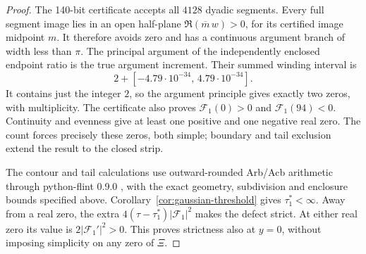 \documentclass[11pt]{article}
\theoremstyle{remark}\newtheorem{remark}[theorem]{Remark}
\begin{document}
\begin{proof}
The 140-bit certificate accepts all $4128$ dyadic segments.
Every full segment image lies in an open half-plane
$\Re(\overline m\,w)>0$, for its certified image midpoint $m$.
It therefore avoids zero and has a continuous argument branch
of width less than $\pi$. The principal argument of the independently
enclosed endpoint ratio is the true argument increment.
Their summed winding interval is
\[
 2+[-4.79\cdot10^{-34},\,4.79\cdot10^{-34}].
\]
It contains just the integer $2$, so the argument principle gives
exactly two zeros, with multiplicity. The certificate also proves
$\mathcal F_1(0)>0$ and $\mathcal F_1(94)<0$.
Continuity and evenness give at least one positive and one negative
real zero. The count forces precisely these zeros, both simple;
boundary and tail exclusion extend the result to the closed strip.

The contour and tail calculations use outward-rounded Arb/Acb
arithmetic through python-flint 0.9.0 \cite{FlintDocs}, with the
exact geometry, subdivision and enclosure bounds specified above.
Corollary~\ref{cor:gaussian-threshold} gives $\tau_1^*<\infty$.
Away from a real zero, the extra
$4(\tau-\tau_1^*)|\mathcal F_1|^2$ makes the defect strict.
At either real zero its value is $2|\mathcal F_1'|^2>0$.
This proves strictness also at $y=0$, without imposing simplicity on
any zero of $\Xi$.
\end{proof}
\end{document}
